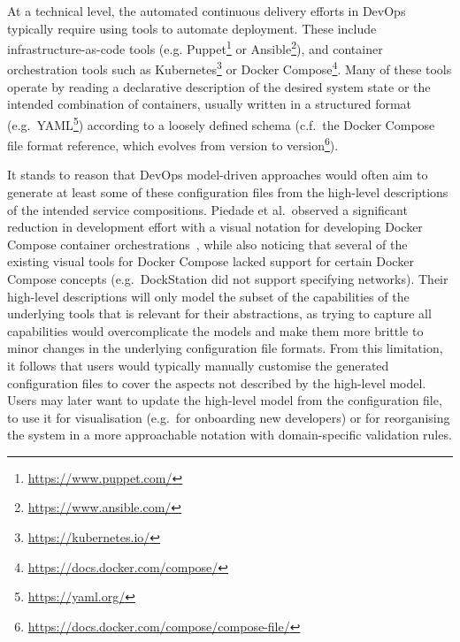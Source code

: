 \documentclass[sigconf,review]{acmart}
\begin{document}
At a technical level, the automated continuous delivery efforts in DevOps
typically require using tools to automate deployment. These include
infrastructure-as-code tools (e.g.
Puppet\footnote{\url{https://www.puppet.com/}} or
Ansible\footnote{\url{https://www.ansible.com/}}), and container orchestration
tools such as Kubernetes\footnote{\url{https://kubernetes.io/}} or Docker
Compose\footnote{\url{https://docs.docker.com/compose/}}. Many of these tools
operate by reading a declarative description of the desired system state or the
intended combination of containers, usually written in a structured format
(e.g.\ YAML\footnote{\url{https://yaml.org/}}) according to a loosely defined
schema (c.f.\ the Docker Compose file format reference, which evolves from
version to
version\footnote{\url{https://docs.docker.com/compose/compose-file/}}).

It stands to reason that DevOps model-driven approaches would often aim to
generate at least some of these configuration files from the high-level
descriptions of the intended service compositions. Piedade et al.\ observed a
significant reduction in development effort with a visual notation for
developing Docker Compose container orchestrations~\cite{piedade_visual_2022},
while also noticing that several of the existing visual tools for Docker Compose
lacked support for certain Docker Compose concepts (e.g.\ DockStation did not
support specifying networks). Their high-level descriptions will only model the
subset of the capabilities of the underlying tools that is relevant for their
abstractions, as trying to capture all capabilities would overcomplicate the
models and make them more brittle to minor changes in the underlying
configuration file formats. From this limitation, it follows that users would
typically manually customise the generated configuration files to cover the
aspects not described by the high-level model. Users may later want to update
the high-level model from the configuration file, to use it for visualisation
(e.g.\ for onboarding new developers) or for reorganising the system in a more
approachable notation with domain-specific validation rules.
\end{document}
